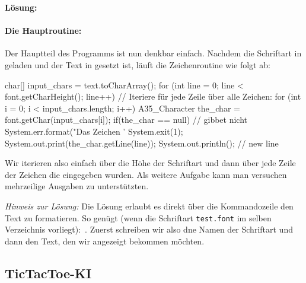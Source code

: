 \documentclass[table]{sopra-base}
\makeatletter
\let\T\texttt
\newenvironment{solution}{\null\par\noindent\textbf{\textcolor{sob@col@uulm@cs}{Lösung:}}\newline\bgroup\color{black}\slshape\ignorespaces}{\egroup}
\makeatother
\begin{document}
\begin{solution}
\paragraph{Die Hauptroutine:}
Der Hauptteil des Programms ist nun denkbar einfach. Nachdem die Schriftart in  geladen und der Text in  gesetzt ist, läuft die Zeichenroutine wie folgt ab:
\begin{java}[firstnumber=32]
char[] input_chars = text.toCharArray();
for (int line = 0; line < font.getCharHeight(); line++) {
    // Iteriere für jede Zeile über alle Zeichen:
    for (int i = 0; i < input_chars.length; i++) {
        A35_Character the_char = font.getChar(input_chars[i]);
        if(the_char == null) { // gibbet nicht
            System.err.format("Das Zeichen '%
            System.exit(1);
        }
        System.out.print(the_char.getLine(line));
    }
    System.out.println(); // new line
}
\end{java}
    Wir iterieren also einfach über die Höhe der Schriftart und dann über jede Zeile der Zeichen die eingegeben wurden. Als weitere Aufgabe kann man versuchen mehrzeilige Ausgaben zu unterstützten.\par{}
    \textit{Hinweis zur Lösung:} Die Lösung erlaubt es direkt über die Kommandozeile den Text zu formatieren. So genügt (wenn die Schriftart \T{test.font} im selben Verzeichnis vorliegt): \,. Zuerst schreiben wir also dne Namen der Schriftart und dann den Text, den wir angezeigt bekommen möchten.
    \egroup
\end{solution}

\subsection{TicTacToe-KI}
\end{document}
